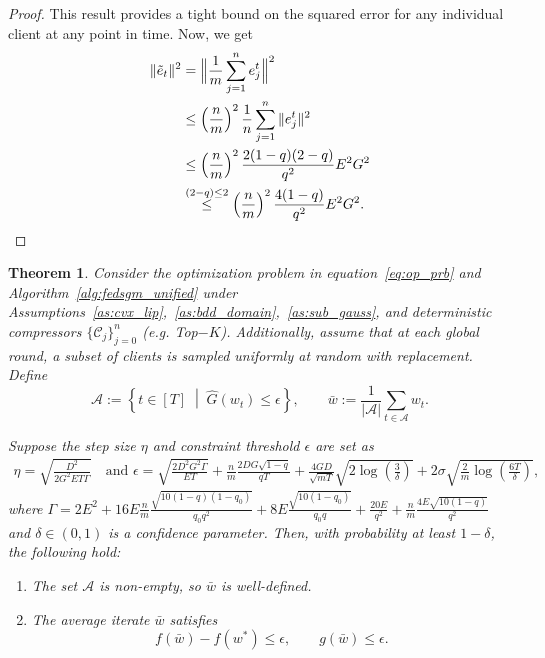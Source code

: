 \documentclass{article} %
\newtheorem{theorem}{Theorem}[]
\def\eqref#1{equation~\ref{#1}}
\def\C{{\mathcal C}}
\begin{document}
\begin{proof}
This result provides a tight bound on the squared error for any individual client at any point in time.
Now, we get
\begin{equation*}
    \begin{aligned}
        \|\tilde e_t\|^2 &= \Bigl\|\frac{1}{m}\sum_{j=1}^n e_j^t\Bigr\|^2
        \\
        &\le \left(\frac{n}{m}\right)^2\frac{1}{n}\sum_{j=1}^n \|e_j^t\|^2
        \\&\le \left(\frac{n}{m}\right)^2 \frac{2(1-q)(2-q)}{q^2}E^2G^2
        \\
        & \overset{(2-q) \leq 2}{\leq} \left(\frac{n}{m}\right)^2 \frac{4(1-q)}{q^2}E^2G^2.
    \end{aligned}
\end{equation*}
\end{proof}
\begin{theorem}
\label{thm:hard_bidrec_partial}
Consider the optimization problem in \eqref{eq:op_prb} and Algorithm~\ref{alg:fedsgm_unified} under Assumptions~\ref{as:cvx_lip},~\ref{as:bdd_domain},~\ref{as:sub_gauss}, and deterministic compressors $\{\C_j\}_{j=0}^{n}$ (e.g. Top$-K$). Additionally, assume that at each global round, a subset of clients is sampled uniformly at random with replacement. Define
\[
\mathcal{A} := \left\{ t \in [T] \;\middle|\; \hat{G}(w_t) \leq \epsilon \right\}, \qquad \bar{w} := \frac{1}{|\mathcal{A}|} \sum_{t \in \mathcal{A}} w_t.
\]

Suppose the step size $\eta$ and constraint threshold $\epsilon$ are set as
\begin{equation*}
\begin{aligned}
\eta = \sqrt{\frac{D^2}{2G^2 E T \Gamma}}
    \quad \text{and }
    \epsilon = \sqrt{\frac{{2 D^2 G^2 \Gamma}}{{E T}}} + \frac{n}{m}\frac{2 DG\sqrt{1-q}}{qT}
        + \frac{4GD}{\sqrt{mT}}\sqrt{2\log\left(\frac{3}{\delta}\right)}
        + 2\sigma\sqrt{\frac{2}{m} \log\left(\frac{6T}{\delta}\right)},
\end{aligned}
\end{equation*}
where $\Gamma = 2 E^2 + 16 E\frac{n}{m}\frac{\sqrt{10(1-q) (1-q_0)}}{q_0q^2} + 8 E\frac{\sqrt{10(1-q_0)}}{q_0q} + \frac{20 E}{ q^2} + \frac{n}{m}\frac{4 E\sqrt{10(1-q)}}{ q^2}$ and $\delta \in (0,1)$ is a confidence parameter. Then, with probability at least $1-\delta$, the following hold:
\begin{enumerate}
    \item The set $\mathcal{A}$ is non-empty, so $\bar{w}$ is well-defined.
    \item The average iterate $\bar{w}$ satisfies
\[
f(\bar{w}) - f(w^*) \leq \epsilon, 
\qquad 
g(\bar{w}) \leq \epsilon.
\]
\end{enumerate}
\end{theorem}
\end{document}
